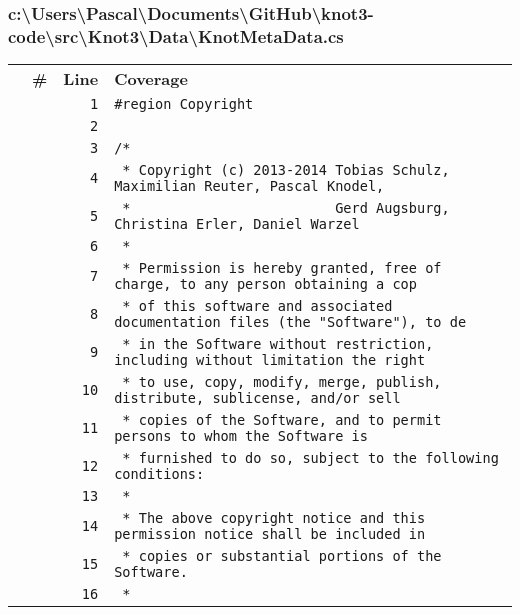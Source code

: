 \documentclass[a4paper,10pt]{article}
\begin{document}
\subsubsection{c:\textbackslash Users\textbackslash Pascal\textbackslash Documents\textbackslash GitHub\textbackslash knot3-code\textbackslash src\textbackslash Knot3\textbackslash Data\textbackslash KnotMetaData.cs}
\begin{longtable}[l]{lrrl}
\textbf{} & \textbf{\#} & \textbf{Line} & \textbf{Coverage}\\
\cellcolor{gray} &  & \verb~1~ & \verb~#region Copyright~\\
\cellcolor{gray} &  & \verb~2~ & \verb~~\\
\cellcolor{gray} &  & \verb~3~ & \verb~/*~\\
\cellcolor{gray} &  & \verb~4~ & \verb~ * Copyright (c) 2013-2014 Tobias Schulz, Maximilian Reuter, Pascal Knodel,~\\
\cellcolor{gray} &  & \verb~5~ & \verb~ *                         Gerd Augsburg, Christina Erler, Daniel Warzel~\\
\cellcolor{gray} &  & \verb~6~ & \verb~ *~\\
\cellcolor{gray} &  & \verb~7~ & \verb~ * Permission is hereby granted, free of charge, to any person obtaining a cop~\\
\cellcolor{gray} &  & \verb~8~ & \verb~ * of this software and associated documentation files (the "Software"), to de~\\
\cellcolor{gray} &  & \verb~9~ & \verb~ * in the Software without restriction, including without limitation the right~\\
\cellcolor{gray} &  & \verb~10~ & \verb~ * to use, copy, modify, merge, publish, distribute, sublicense, and/or sell~\\
\cellcolor{gray} &  & \verb~11~ & \verb~ * copies of the Software, and to permit persons to whom the Software is~\\
\cellcolor{gray} &  & \verb~12~ & \verb~ * furnished to do so, subject to the following conditions:~\\
\cellcolor{gray} &  & \verb~13~ & \verb~ *~\\
\cellcolor{gray} &  & \verb~14~ & \verb~ * The above copyright notice and this permission notice shall be included in ~\\
\cellcolor{gray} &  & \verb~15~ & \verb~ * copies or substantial portions of the Software.~\\
\cellcolor{gray} &  & \verb~16~ & \verb~ *~\\

\end{longtable}
\end{document}
